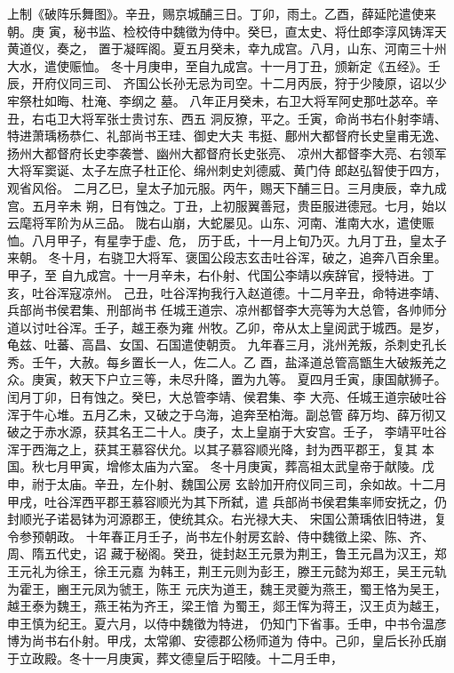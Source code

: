 \documentclass[12pt,UTF8]{ctexbook}
\begin{document}
上制《破阵乐舞图》。辛丑，赐京城酺三日。丁卯，雨土。乙酉，薛延陀遣使来朝。庚
寅，秘书监、检校侍中魏徵为侍中。癸巳，直太史、将仕郎李淳风铸浑天黄道仪，奏之，
置于凝晖阁。夏五月癸未，幸九成宫。八月，山东、河南三十州大水，遣使赈恤。
冬十月庚申，至自九成宫。十一月丁丑，颁新定《五经》。壬辰，开府仪同三司、
齐国公长孙无忌为司空。十二月丙辰，狩于少陵原，诏以少牢祭杜如晦、杜淹、李纲之
墓。
八年正月癸未，右卫大将军阿史那吐苾卒。辛丑，右屯卫大将军张士贵讨东、西五
洞反獠，平之。壬寅，命尚书右仆射李靖、特进萧瑀杨恭仁、礼部尚书王珪、御史大夫
韦挺、鄜州大都督府长史皇甫无逸、扬州大都督府长史李袭誉、幽州大都督府长史张亮、
凉州大都督李大亮、右领军大将军窦诞、太子左庶子杜正伦、绵州刺史刘德威、黄门侍
郎赵弘智使于四方，观省风俗。
二月乙巳，皇太子加元服。丙午，赐天下酺三日。三月庚辰，幸九成宫。五月辛未
朔，日有蚀之。丁丑，上初服翼善冠，贵臣服进德冠。七月，始以云麾将军阶为从三品。
陇右山崩，大蛇屡见。山东、河南、淮南大水，遣使赈恤。八月甲子，有星孛于虚、危，
历于氐，十一月上旬乃灭。九月丁丑，皇太子来朝。
冬十月，右骁卫大将军、褒国公段志玄击吐谷浑，破之，追奔八百余里。甲子，至
自九成宫。十一月辛未，右仆射、代国公李靖以疾辞官，授特进。丁亥，吐谷浑寇凉州。
己丑，吐谷浑拘我行入赵道德。十二月辛丑，命特进李靖、兵部尚书侯君集、刑部尚书
任城王道宗、凉州都督李大亮等为大总管，各帅师分道以讨吐谷浑。壬子，越王泰为雍
州牧。乙卯，帝从太上皇阅武于城西。是岁，龟兹、吐蕃、高昌、女国、石国遣使朝贡。
九年春三月，洮州羌叛，杀刺史孔长秀。壬午，大赦。每乡置长一人，佐二人。乙
酉，盐泽道总管高甑生大破叛羌之众。庚寅，敕天下户立三等，未尽升降，置为九等。
夏四月壬寅，康国献狮子。闰月丁卯，日有蚀之。癸巳，大总管李靖、侯君集、李
大亮、任城王道宗破吐谷浑于牛心堆。五月乙未，又破之于乌海，追奔至柏海。副总管
薛万均、薛万彻又破之于赤水源，获其名王二十人。庚子，太上皇崩于大安宫。壬子，
李靖平吐谷浑于西海之上，获其王慕容伏允。以其子慕容顺光降，封为西平郡王，复其
本国。秋七月甲寅，增修太庙为六室。
冬十月庚寅，葬高祖太武皇帝于献陵。戊申，祔于太庙。辛丑，左仆射、魏国公房
玄龄加开府仪同三司，余如故。十二月甲戌，吐谷浑西平郡王慕容顺光为其下所弑，遣
兵部尚书侯君集率师安抚之，仍封顺光子诺曷钵为河源郡王，使统其众。右光禄大夫、
宋国公萧瑀依旧特进，复令参预朝政。
十年春正月壬子，尚书左仆射房玄龄、侍中魏徵上梁、陈、齐、周、隋五代史，诏
藏于秘阁。癸丑，徙封赵王元景为荆王，鲁王元昌为汉王，郑王元礼为徐王，徐王元嘉
为韩王，荆王元则为彭王，滕王元懿为郑王，吴王元轨为霍王，豳王元凤为虢王，陈王
元庆为道王，魏王灵夔为燕王，蜀王恪为吴王，越王泰为魏王，燕王祐为齐王，梁王愔
为蜀王，郯王恽为蒋王，汉王贞为越王，申王慎为纪王。夏六月，以侍中魏徵为特进，
仍知门下省事。壬申，中书令温彦博为尚书右仆射。甲戌，太常卿、安德郡公杨师道为
侍中。己卯，皇后长孙氏崩于立政殿。冬十一月庚寅，葬文德皇后于昭陵。十二月壬申，
\end{document}
